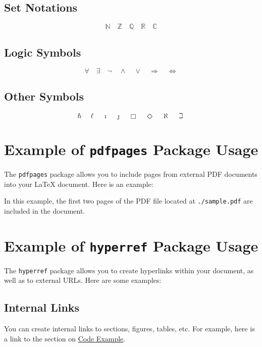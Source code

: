 \documentclass[]{article}
\begin{document}
\subsection{Set Notations}

\[
\mathbb{N} \quad \mathbb{Z} \quad \mathbb{Q} \quad \mathbb{R} \quad \mathbb{C}
\]

\subsection{Logic Symbols}

\[
\forall \quad \exists \quad \neg \quad \wedge \quad \vee \quad \Rightarrow \quad \Leftrightarrow
\]

\subsection{Other Symbols}

\[
\hbar \quad \ell \quad \imath \quad \jmath \quad \Box \quad \Diamond \quad \aleph \quad \beth
\]

\section{Example of \texttt{pdfpages} Package Usage}

The \texttt{pdfpages} package allows you to include pages from external PDF documents into your LaTeX document. Here is an example:



In this example, the first two pages of the PDF file located at \texttt{./sample.pdf} are included in the document.


\section{Example of \texttt{hyperref} Package Usage}

The \texttt{hyperref} package allows you to create hyperlinks within your document, as well as to external URLs. Here are some examples:

\subsection{Internal Links}

You can create internal links to sections, figures, tables, etc. For example, here is a link to the section on \hyperref[sec:code-example]{Code Example}.
\end{document}
